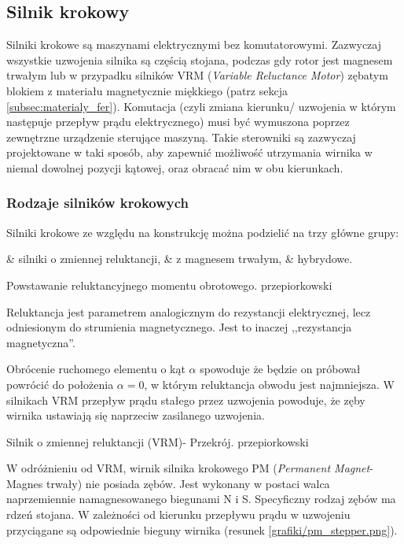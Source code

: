 \subsection{Silnik krokowy}

Silniki krokowe są maszynami elektrycznymi bez komutatorowymi. Zazwyczaj wszystkie uzwojenia silnika są częścią stojana, podczas gdy rotor jest magnesem trwałym lub w przypadku silników VRM ({\em Variable Reluctance Motor}) zębatym blokiem z materiału magnetycznie miękkiego (patrz sekcja \ref{subsec:materialy_fer}). Komutacja (czyli zmiana kierunku/ uzwojenia w którym następuje przepływ prądu elektrycznego) musi być wymuszona poprzez zewnętrzne urządzenie sterujące maszyną. Takie sterowniki są zazwyczaj projektowane w taki sposób, aby zapewnić możliwość utrzymania wirnika w niemal dowolnej pozycji kątowej, oraz obracać nim w obu kierunkach. 

\subsubsection{Rodzaje silników krokowych}

Silniki krokowe ze względu na konstrukcję można podzielić na trzy główne grupy: 
\begin{easylist}
	& silniki o zmiennej reluktancji,
	& z magnesem trwałym,
	& hybrydowe.
\end{easylist}

		{Powstawanie reluktancyjnego momentu obrotowego.}
		{przepiorkowski}

Reluktancja jest parametrem analogicznym do rezystancji elektrycznej, lecz odniesionym do strumienia magnetycznego. Jest to inaczej ,,rezystancja magnetyczna''.

Obrócenie ruchomego elementu o kąt $ \alpha $ spowoduje że będzie on próbował powrócić do położenia $ \alpha = 0 $, w którym reluktancja obwodu jest najmniejsza. W silnikach VRM przepływ prądu stałego przez uzwojenia powoduje, że zęby wirnika ustawiają się naprzeciw zasilanego uzwojenia.

		{Silnik o zmiennej reluktancji (VRM)- Przekrój.}
		{przepiorkowski}

W odróżnieniu od VRM, wirnik silnika krokowego PM ({\em Permanent Magnet}- Magnes trwały) nie posiada zębów. Jest wykonany w postaci walca naprzemiennie namagnesowanego biegunami N i S. Specyficzny rodzaj zębów ma rdzeń stojana. \newline
W zależności od kierunku przepływu prądu w uzwojeniu przyciągane są odpowiednie bieguny wirnika (resunek \ref{grafiki/pm_stepper.png}).

